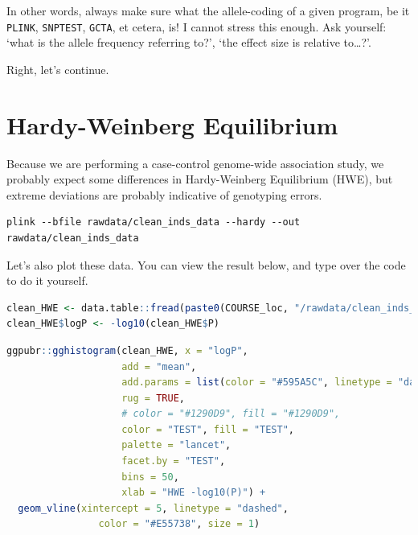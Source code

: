 \documentclass[
]{book}
\newcommand{\passthrough}[1]{#1}
\begin{document}
In other words, always make sure what the allele-coding of a given program, be it \passthrough{\lstinline!PLINK!}, \passthrough{\lstinline!SNPTEST!}, \passthrough{\lstinline!GCTA!}, et cetera, is! I cannot stress this enough. Ask yourself: `what is the allele frequency referring to?', `the effect size is relative to\ldots?'.

Right, let's continue.

\hypertarget{hardy-weinberg-equilibrium}{%
\section{Hardy-Weinberg Equilibrium}\label{hardy-weinberg-equilibrium}}

Because we are performing a case-control genome-wide association study, we probably expect some differences in Hardy-Weinberg Equilibrium (HWE), but extreme deviations are probably indicative of genotyping errors.

\begin{lstlisting}
plink --bfile rawdata/clean_inds_data --hardy --out rawdata/clean_inds_data
\end{lstlisting}

Let's also plot these data. You can view the result below, and type over the code to do it yourself.

\begin{lstlisting}[language=R]
clean_HWE <- data.table::fread(paste0(COURSE_loc, "/rawdata/clean_inds_data.hwe"))
clean_HWE$logP <- -log10(clean_HWE$P)
\end{lstlisting}

\begin{lstlisting}[language=R]
ggpubr::gghistogram(clean_HWE, x = "logP",
                    add = "mean",
                    add.params = list(color = "#595A5C", linetype = "dashed", size = 1),
                    rug = TRUE,
                    # color = "#1290D9", fill = "#1290D9",
                    color = "TEST", fill = "TEST",
                    palette = "lancet",
                    facet.by = "TEST",
                    bins = 50,
                    xlab = "HWE -log10(P)") +
  geom_vline(xintercept = 5, linetype = "dashed",
                color = "#E55738", size = 1)
\end{lstlisting}
\end{document}
